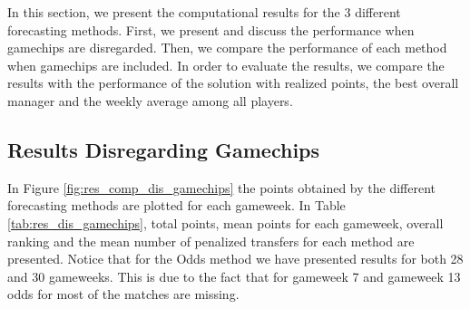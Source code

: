 In this section, we present the computational results for the 3 different forecasting methods. First, we present and discuss the performance when gamechips are disregarded. Then, we compare the performance of each method when gamechips are included. In order to evaluate the results, we compare the results with the performance of the solution with realized points, the best overall manager and the weekly average among all players. 

\newpage

\subsection{Results Disregarding Gamechips}

In Figure \ref{fig:res_comp_dis_gamechips} the points obtained by the different forecasting methods are plotted for each gameweek. In Table \ref{tab:res_dis_gamechips}, total points, mean points for each gameweek, overall ranking and the mean number of penalized transfers for each method are presented. Notice that for the Odds method we have presented results for both 28 and 30 gameweeks. This is due to the fact that for gameweek 7 and gameweek 13 odds for most of the matches are missing.


